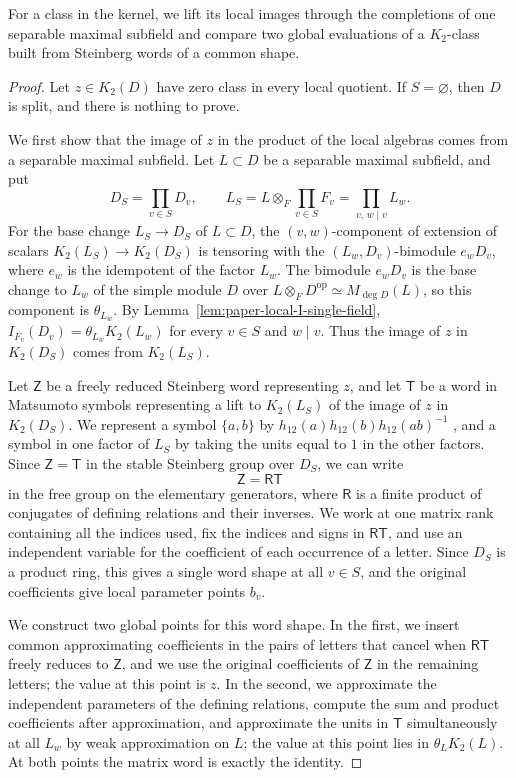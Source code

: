 For a class in the kernel, we lift its local images through the completions of one separable maximal subfield and compare two global evaluations of a $K_2$-class built from Steinberg words of a common shape.

\begin{proof}
Let $z\in K_2(D)$ have zero class in every local quotient.
If $S=\varnothing$, then $D$ is split, and there is nothing to prove.

We first show that the image of $z$ in the product of the local algebras comes from a separable maximal subfield.
Let $L\subset D$ be a separable maximal subfield, and put
\[
 D_S=\prod_{v\in S}D_v,\qquad L_S=L\otimes_F\prod_{v\in S}F_v=\prod_{v,\,w\mid v}L_w.
\]
For the base change $L_S\to D_S$ of $L\subset D$, the $(v,w)$-component of extension of scalars $K_2(L_S)\to K_2(D_S)$ is tensoring with the $(L_w,D_v)$-bimodule $e_wD_v$, where $e_w$ is the idempotent of the factor $L_w$.
The bimodule $e_wD_v$ is the base change to $L_w$ of the simple module $D$ over $L\otimes_F D^{\mathrm{op}}\simeq M_{\deg D}(L)$, so this component is $\theta_{L_w}$.
By Lemma~\ref{lem:paper-local-I-single-field}, $I_{F_v}(D_v)=\theta_{L_w}K_2(L_w)$ for every $v\in S$ and $w\mid v$.
Thus the image of $z$ in $K_2(D_S)$ comes from $K_2(L_S)$.

Let $\mathsf Z$ be a freely reduced Steinberg word representing $z$, and let $\mathsf T$ be a word in Matsumoto symbols representing a lift to $K_2(L_S)$ of the image of $z$ in $K_2(D_S)$.
We represent a symbol $\{a,b\}$ by $h_{12}(a)h_{12}(b)h_{12}(ab)^{-1}$ \cite{Matsumoto}, and a symbol in one factor of $L_S$ by taking the units equal to $1$ in the other factors.
Since $\mathsf Z=\mathsf T$ in the stable Steinberg group over $D_S$, we can write
\[
 \mathsf Z=\mathsf R\mathsf T
\]
in the free group on the elementary generators, where $\mathsf R$ is a finite product of conjugates of defining relations and their inverses.
We work at one matrix rank containing all the indices used, fix the indices and signs in $\mathsf R\mathsf T$, and use an independent variable for the coefficient of each occurrence of a letter.
Since $D_S$ is a product ring, this gives a single word shape at all $v\in S$, and the original coefficients give local parameter points $b_v$.

We construct two global points for this word shape.
In the first, we insert common approximating coefficients in the pairs of letters that cancel when $\mathsf R\mathsf T$ freely reduces to $\mathsf Z$, and we use the original coefficients of $\mathsf Z$ in the remaining letters; the value at this point is $z$.
In the second, we approximate the independent parameters of the defining relations, compute the sum and product coefficients after approximation, and approximate the units in $\mathsf T$ simultaneously at all $L_w$ by weak approximation on $L$; the value at this point lies in $\theta_L K_2(L)$.
At both points the matrix word is exactly the identity.


\end{proof}
